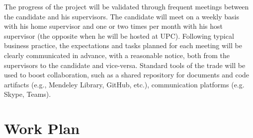 \documentclass[12pt]{article}
\begin{document}
The progress of the project will be validated through frequent meetings between the candidate and his supervisors. The candidate will meet on a weekly basis with his home supervisor and one or two times per month with his host supervisor (the opposite when he will be hosted at UPC). Following typical business practice, the expectations and tasks planned for each meeting will be clearly communicated in advance, with a reasonable notice, both from the supervisors to the candidate and vice-versa. Standard tools of the trade will be used to boost collaboration, such
as a shared repository for documents and code artifacts (e.g., Mendeley Library, GitHub, etc.), communication platforms (e.g. Skype, Teams).


\section{Work Plan}
\end{document}

